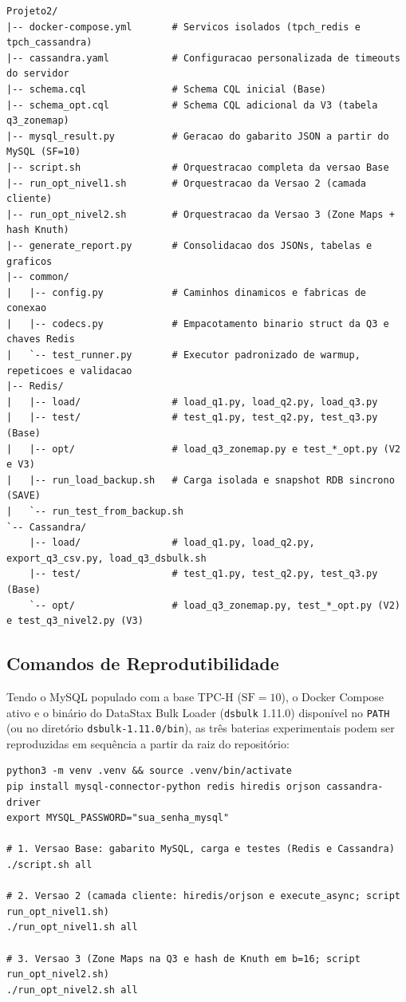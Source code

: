 \documentclass[12pt,a4paper]{article}
\begin{document}
\begin{lstlisting}[caption={Organização dos arquivos-fonte no repositório do projeto.}]
Projeto2/
|-- docker-compose.yml       # Servicos isolados (tpch_redis e tpch_cassandra)
|-- cassandra.yaml           # Configuracao personalizada de timeouts do servidor
|-- schema.cql               # Schema CQL inicial (Base)
|-- schema_opt.cql           # Schema CQL adicional da V3 (tabela q3_zonemap)
|-- mysql_result.py          # Geracao do gabarito JSON a partir do MySQL (SF=10)
|-- script.sh                # Orquestracao completa da versao Base
|-- run_opt_nivel1.sh        # Orquestracao da Versao 2 (camada cliente)
|-- run_opt_nivel2.sh        # Orquestracao da Versao 3 (Zone Maps + hash Knuth)
|-- generate_report.py       # Consolidacao dos JSONs, tabelas e graficos
|-- common/
|   |-- config.py            # Caminhos dinamicos e fabricas de conexao
|   |-- codecs.py            # Empacotamento binario struct da Q3 e chaves Redis
|   `-- test_runner.py       # Executor padronizado de warmup, repeticoes e validacao
|-- Redis/
|   |-- load/                # load_q1.py, load_q2.py, load_q3.py
|   |-- test/                # test_q1.py, test_q2.py, test_q3.py (Base)
|   |-- opt/                 # load_q3_zonemap.py e test_*_opt.py (V2 e V3)
|   |-- run_load_backup.sh   # Carga isolada e snapshot RDB sincrono (SAVE)
|   `-- run_test_from_backup.sh
`-- Cassandra/
    |-- load/                # load_q1.py, load_q2.py, export_q3_csv.py, load_q3_dsbulk.sh
    |-- test/                # test_q1.py, test_q2.py, test_q3.py (Base)
    `-- opt/                 # load_q3_zonemap.py, test_*_opt.py (V2) e test_q3_nivel2.py (V3)
\end{lstlisting}

\subsection*{Comandos de Reprodutibilidade}
Tendo o MySQL populado com a base TPC-H ($\text{SF}=10$), o Docker Compose ativo e o binário do DataStax Bulk Loader (\texttt{dsbulk} 1.11.0) disponível no \texttt{PATH} (ou no diretório \texttt{dsbulk-1.11.0/bin}), as três baterias experimentais podem ser reproduzidas em sequência a partir da raiz do repositório:

\begin{lstlisting}[caption={Sequência de comandos para preparar o ambiente e reproduzir Base, Versão 2 e Versão 3.}]
python3 -m venv .venv && source .venv/bin/activate
pip install mysql-connector-python redis hiredis orjson cassandra-driver
export MYSQL_PASSWORD="sua_senha_mysql"

# 1. Versao Base: gabarito MySQL, carga e testes (Redis e Cassandra)
./script.sh all

# 2. Versao 2 (camada cliente: hiredis/orjson e execute_async; script run_opt_nivel1.sh)
./run_opt_nivel1.sh all

# 3. Versao 3 (Zone Maps na Q3 e hash de Knuth em b=16; script run_opt_nivel2.sh)
./run_opt_nivel2.sh all
\end{lstlisting}
\end{document}
